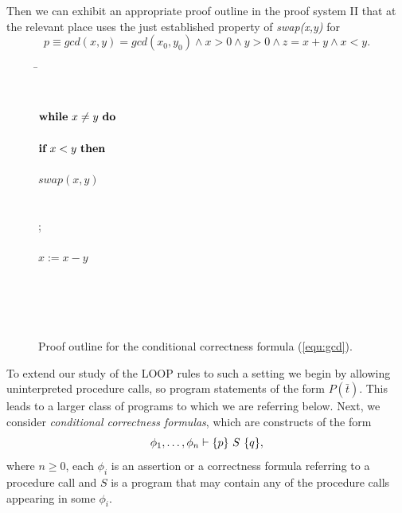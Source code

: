 \documentclass[runningheads]{llncs}       %
\begin{document}
Then we can exhibit an appropriate proof outline in the proof
system II that at the relevant place uses the just established property of 
\emph{swap(x,y)} for 
\[
  p \equiv gcd(x,y)=gcd(x_0, y_0)  \wedge x>0 \wedge y>0 \wedge z = x+y \wedge x < y.
\]
 \begin{figure}[ht]
 \begin{tabbing}
 \qquad\qquad                                       
\=  \\
\>  \\
\>      \\
\> $\mbox{$\mbox{{\bf while}\ } {x \neq y}\ \mbox{{\bf do}\ }$}$                          \\
\>  \qquad {} \\
\>  \qquad $\mbox{{\bf if}\ } x < y \mbox{\ {\bf then}\ }$                         \\
\> \qquad \qquad {} \\
\>  \qquad \qquad  $swap(x,y) $                         \\
\> \qquad \qquad {} \\
\> \qquad \qquad {} \\
\>  \qquad \FI; \\
\>  \qquad {} \\
\>  \qquad $x:= x-y$                         \\
\>  \qquad {} \\
\>  \OD                                      \\
\>  \\
\>  \\
\>  
\end{tabbing}
\caption{Proof outline for the conditional correctness formula (\ref{equ:gcd}).}
\label{fig:gcd}

\end{figure}

To extend our study of the LOOP rules to such a setting we
begin by allowing uninterpreted procedure calls, so program statements
of the form $P(\bar{t})$. This leads to a larger class of programs to
which we are referring below. Next, we consider \emph{conditional
  correctness formulas}, which are constructs of the form
\[
\phi_1, \dots, \phi_n \vdash \mbox{$\{{p}\}\ {S}\ \{{q}\}$},
\]
where $n \geq 0$, each $\phi_i$ is an assertion or a correctness
formula referring to a procedure call and $S$ is a program that may
contain any of the procedure calls appearing in some $\phi_i$.
\end{document}
